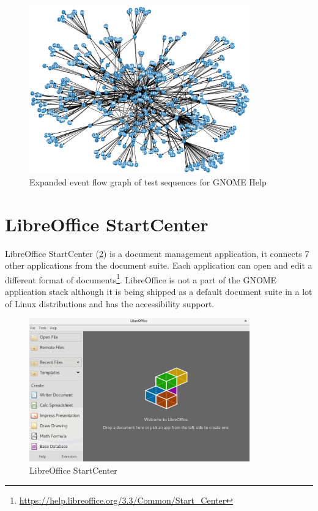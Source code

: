 \begin{figure}[H]
	\centering
	\includegraphics[width=0.85\textwidth,clip]{obrazky-figures/yelp_n_final.png}
	\caption{Expanded event flow graph of test sequences for GNOME Help}
	\label{yelp_end}
\end{figure}

\section{LibreOffice StartCenter}

LibreOffice StartCenter (\ref{libreoffice-gui}) is a document management application, it connects 7 other applications from the document suite. Each application can open and edit a different format of documents\footnote{\url{https://help.libreoffice.org/3.3/Common/Start_Center}}. LibreOffice is not a part of the GNOME application stack although it is being shipped as a default document suite in a lot of Linux distributions and has the accessibility support.

\begin{figure}[H]
	\centering
	\includegraphics[width=0.85\textwidth,clip]{obrazky-figures/libreoffice_GUI.png}
	\caption{LibreOffice StartCenter}
	\label{libreoffice-gui}
\end{figure}


